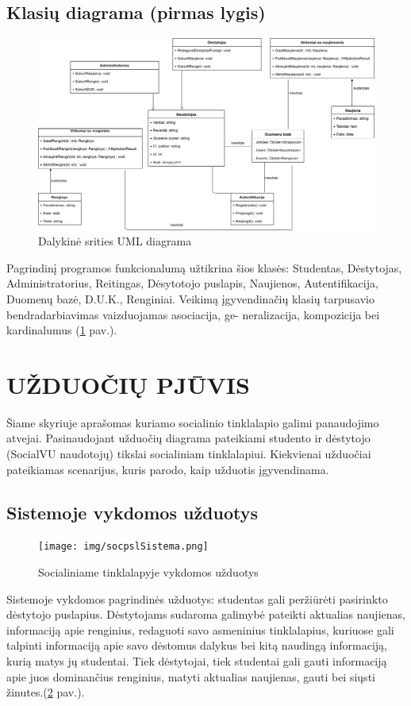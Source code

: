 \documentclass{VUMIFPSkursinis}
\begin{document}
\subsection{Klasių diagrama (pirmas lygis)}
\begin{figure}[H]
\centering
\includegraphics[width=\linewidth]{img/pagrindine.png}
\caption{Dalykinė srities UML diagrama}
\label{fig:pagrindine}
\end{figure}
Pagrindinį programos funkcionalumą užtikrina šios klasės: Studentas, Dėstytojas, Administratorius, Reitingas, Dėsytotojo puslapis, Naujienos, Autentifikacija, Duomenų bazė,
D.U.K., Renginiai. Veikimą įgyvendinačių klasių tarpusavio bendradarbiavimas vaizduojamas asociacija, ge-
neralizacija, kompozicija bei kardinalumus (\ref{fig:pagrindine}  pav.).
\newpage
\section{UŽDUOČIŲ PJŪVIS}
Šiame skyriuje aprašomas kuriamo socialinio tinklalapio galimi panaudojimo atvejai. Pasinaudojant užduočių diagrama pateikiami studento ir dėstytojo (SocialVU naudotojų) tikslai socialiniam tinklalapiui. Kiekvienai užduočiai pateikiamas scenarijus, kuris parodo, kaip užduotis įgyvendinama.
\subsection{Sistemoje vykdomos užduotys}
\begin{figure}[H]
\centering
\texttt{[image: img/socpslSistema.png]}
\caption{Socialiniame tinklalapyje vykdomos užduotys}
\label{fig:socpslsist}
\end{figure}
Sistemoje vykdomos pagrindinės užduotys: studentas gali peržiūrėti pasirinkto dėstytojo puslapius. Dėstytojams sudaroma galimybė pateikti aktualias naujienas, informaciją apie renginius, redaguoti savo asmeninius tinklalapius, kuriuose gali talpinti informaciją apie savo dėstomus dalykus bei kitą naudingą informaciją, kurią matys jų studentai. Tiek dėstytojai, tiek studentai gali gauti informaciją apie juos dominančius renginius, matyti aktualias naujienas, gauti bei siųsti žinutes.(\ref{fig:socpslsist} pav.).
\end{document}
